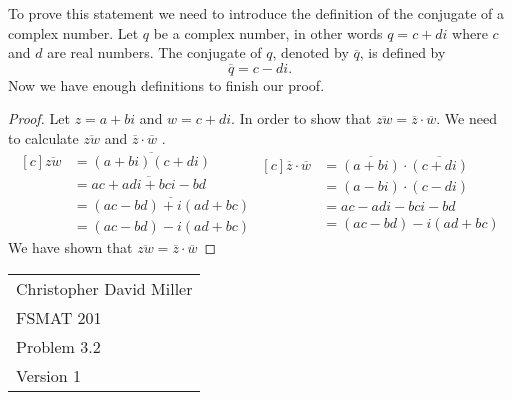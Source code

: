 \documentclass[12pt]{article}
\begin{document}
To prove this statement we need to introduce the definition of the conjugate of a complex number. Let $q$ be a complex number, in other words $q = c + di$ where $c$ and $d$ are real numbers. The conjugate of $q$, denoted by $\overline{q}$, is defined by $$\overline{q}= c - di.$$
Now we have enough definitions to finish our proof.
\begin{proof}
  
  Let $z = a + bi$ and $w = c + di $. In order to show that  $\overline{zw} = \overline{z} \cdot \overline{w}$. We need to calculate $\overline{zw}$ and $\overline{z} \cdot \overline{w}$ .
  \begin{equation*}
    \begin{aligned}[c]
      \overline{zw} &= \overline{(a+bi)(c+di)} \\ 
       &= \overline{ac+adi+bci-bd}\\
       &= \overline{(ac-bd)+i(ad+bc)}\\
       &= (ac-bd)-i(ad+bc)  
    \end{aligned}
    \begin{aligned}[c]
      \overline{z} \cdot \overline{w} &= \overline{(a+bi)} \cdot \overline{(c+di)} \\ 
       &= (a-bi) \cdot (c-di)\\
       &= ac -adi-bci-bd\\
       &= (ac-bd)-i(ad+bc)  
    \end{aligned}
  \end{equation*}
  We have shown that $\overline{zw} = \overline{z} \cdot \overline{w}$
    
      
      

    
\end{proof}
\newpage
\begin{flushright}
  \begin{tabular}{l}
  Christopher David Miller \\  %
  FSMAT 201 \\  %
  Problem 3.2 \\  %
  Version 1 \\ %
  \end{tabular}
  \end{flushright}
  \vspace{20pt}  %
  
\end{document}

